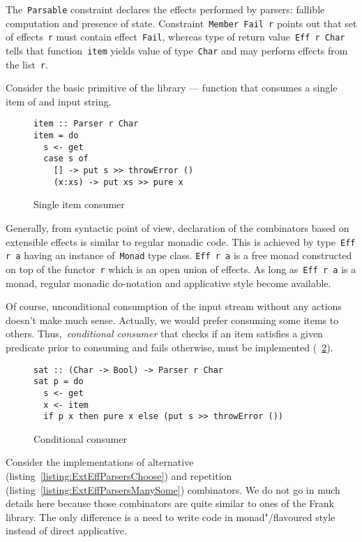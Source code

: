       The~\texttt{Parsable} constraint declares the effects performed by parsers:
      fallible computation and presence of state. Constraint~\texttt{Member Fail r} points out that set of effects~\texttt{r} must contain effect~\texttt{Fail}, whereas type of return
      value~\texttt{Eff r Char} tells that function~\texttt{item} yields value
      of type~\texttt{Char} and may perform effects from the list~\texttt{r}.

      Consider the basic primitive of the library --- function that consumes
      a single item of and input string.

      \begin{figure}[h]
      \begin{lstlisting}
item :: Parser r Char
item = do
  s <- get
  case s of
    [] -> put s >> throwError ()
    (x:xs) -> put xs >> pure x
      \end{lstlisting}
      \caption{Single item consumer}
      \label{listing:ExtEffParsersItem}
      \end{figure}

      Generally, from syntactic point of view, declaration of the combinators based on
      extensible effects is similar to regular monadic code. This is achieved by
      type~\texttt{Eff r a} having an instance of~\texttt{Monad} type class.
      \texttt{Eff r a} is a free monad constructed on top of the functor~\texttt{r}
      which is an open union of effects. As long as~\texttt{Eff r a} is a monad,
      regular monadic do-notation and applicative style become available.

      Of course, unconditional consumption of the input stream without any actions
      doesn't make much sense. Actually, we would prefer consuming some items to others. Thus,~\emph{conditional consumer} that checks if an item satisfies a
      given predicate prior to consuming and fails otherwise, must be
      implemented (~\ref{listing:ExtEffParsersSat}).

      \begin{figure}[h]
      \begin{lstlisting}
sat :: (Char -> Bool) -> Parser r Char
sat p = do
  s <- get
  x <- item
  if p x then pure x else (put s >> throwError ())
      \end{lstlisting}
      \caption{Conditional consumer}
      \label{listing:ExtEffParsersSat}
      \end{figure}

      Consider the implementations of alternative (listing~\ref{listing:ExtEffParsersChoose})
      and repetition (listing~\ref{listing:ExtEffParsersManySome}) combinators. We
      do not go in much details here because those combinators are quite similar
      to ones of the Frank library. The only difference is a need to write
      code in monad"/flavoured style instead of direct applicative.

